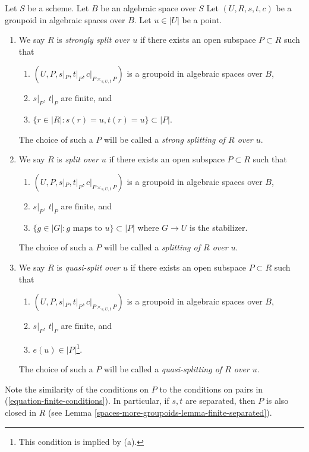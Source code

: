 \begin{definition}
Let $S$ be a scheme. Let $B$ be an algebraic space over $S$
Let $(U, R, s, t, c)$ be a groupoid in algebraic spaces over $B$.
Let $u \in |U|$ be a point.
\begin{enumerate}
\item We say $R$ is {\it strongly split over $u$} if there exists an open
subspace $P \subset R$ such that
\begin{enumerate}
\item $(U, P, s|_P, t|_P, c|_{P \times_{s, U, t} P})$ is a
groupoid in algebraic spaces over $B$,
\item $s|_P$, $t|_P$ are finite, and
\item $\{r \in |R| : s(r) = u, t(r) = u\} \subset |P|$.
\end{enumerate}
The choice of such a $P$ will be called a
{\it strong splitting of $R$ over $u$}.
\item We say $R$ is {\it split over $u$} if there exists an open
subspace $P \subset R$ such that
\begin{enumerate}
\item $(U, P, s|_P, t|_P, c|_{P \times_{s, U, t} P})$ is a
groupoid in algebraic spaces over $B$,
\item $s|_P$, $t|_P$ are finite, and
\item $\{g \in |G| : g\text{ maps to }u\} \subset |P|$ where
$G \to U$ is the stabilizer.
\end{enumerate}
The choice of such a $P$ will be called a
{\it splitting of $R$ over $u$}.
\item We say $R$ is {\it quasi-split over $u$} if there exists an open
subspace $P \subset R$ such that
\begin{enumerate}
\item $(U, P, s|_P, t|_P, c|_{P \times_{s, U, t} P})$ is a
groupoid in algebraic spaces over $B$,
\item $s|_P$, $t|_P$ are finite, and
\item $e(u) \in |P|$\footnote{This condition is implied by (a).}.
\end{enumerate}
The choice of such a $P$ will be called a {\it quasi-splitting of $R$ over $u$}.
\end{enumerate}
\end{definition}

Note the similarity of the conditions on $P$ to the conditions on
pairs in (\ref{equation-finite-conditions}). In particular, if
$s, t$ are separated, then $P$ is also closed in $R$ (see
Lemma \ref{spaces-more-groupoids-lemma-finite-separated}).


